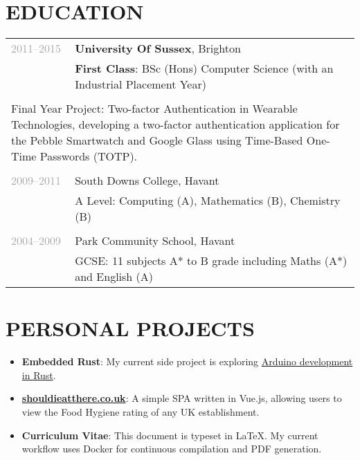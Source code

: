 \documentclass{article}
\newenvironment{exptable}{
  \begin{longtable}{lp{0.8\textwidth}}
  }{
  \end{longtable}
}
\begin{document}
  \section*{EDUCATION}
    \begin{exptable}
      \textcolor{darkgray}{2011--2015} & {\bf University Of Sussex}, Brighton \\
                 & {\bf First Class}: BSc (Hons) Computer Science (with an Industrial Placement Year) \\
                 & \\
      \multicolumn{2}{p{\textwidth}}{
      Final Year Project: Two-factor Authentication in Wearable Technologies, developing a two-factor authentication application for the Pebble Smartwatch and Google Glass using Time-Based One-Time Passwords (TOTP).
      } \\
                 & \\
      \textcolor{darkgray}{2009--2011} & South Downs College, Havant \\
                 & A Level: Computing (A), Mathematics (B), Chemistry (B) \\
                 & \\
      \textcolor{darkgray}{2004--2009} & Park Community School, Havant \\
                 & GCSE: 11 subjects A* to B grade including Maths (A*) and English (A)
    \end{exptable}

 \section*{PERSONAL PROJECTS}
 \vspace{1em}
  \begin{itemize}
    \item \textbf{Embedded Rust}: My current side project is exploring \href{https://github.com/DCRichards/arduino-vagrant-rust}{Arduino development in Rust}.
    \item \href{https://shouldieatthere.co.uk}{\textbf{shouldieatthere.co.uk}}: A simple SPA written in Vue.js, allowing users to view the Food Hygiene rating of any UK establishment.
    \item \textbf{Curriculum Vitae}: This document is typeset in LaTeX. My current workflow uses Docker for continuous compilation and PDF generation.
  \end{itemize}
 \vspace{1em}
\end{document}
